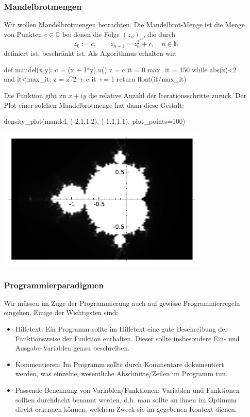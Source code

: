 \documentclass[fontsize=12pt,paper=a4,twoside,bibtotoc,idxtotoc,
liststotoc,pagesize,BCOR1.2cm,DIV15,chapterprefix,pagesize=pdftex]{scrbook}
\theoremstyle{plain}
\theoremstyle{definition}
\theoremstyle{remark}
\begin{document}
\subsubsection{Mandelbrotmengen}
Wir wollen Mandelbrotmengen betrachten. Die Mandelbrot-Menge ist die Menge von Punkten $c \in \mathbb{C}$
bei denen die Folge $(z_n)_n$, die durch
\[ z_0:=c, \qquad  z_{n+1} = z_n^2 +c, \quad n \in \mathbb{N}\]
definiert ist, beschränkt ist. Als Algorithmus erhalten wir:
\begin{sagein}
def mandel(x,y):
    c = (x + I*y).n()
    z = c
    it = 0
    max_it = 150
    while abs(z)<2 and it<max_it:
        z = z^2 + c
        it += 1
    return float(it/max_it)
\end{sagein}
Die Funktion  gibt zu $x+iy$ die relative Anzahl der
Iterationsschritte zurück. Der Plot einer solchen Mandelbrotmenge hat dann diese Gestalt:
\begin{sagein}
density_plot(mandel, (-2.1,1.2), (-1.1,1.1), plot_points=100)
\end{sagein}
\begin{center}
\includegraphics[width=0.8\textwidth]{mandel.pdf} 
\end{center}
\subsubsection{Programmierparadigmen}
Wir müssen im Zuge der Programmierung auch auf gewisse Programmierregeln eingehen. Einige der Wichtigsten sind:
\begin{itemize}
\item Hilfetext: Ein Programm sollte im Hilfetext eine gute Beschreibung der Funktionsweise der Funktion enthalten. Dieser sollte insbesondere Ein- und Ausgabe-Variablen genau beschreiben.
\item Kommentieren: Im Programm sollte durch Kommentare dokumentiert werden, was einzelne, wesentliche Abschnitte/Zeilen im Programm tun.
\item Passende Benennung von Variablen/Funktionen: Variablen und Funktionen sollten durchdacht benannt werden, d.h. man sollte an ihnen im Optimum direkt erkennen können, welchem Zweck sie im gegebenen Kontext dienen. 
\end{itemize}
\end{document}
